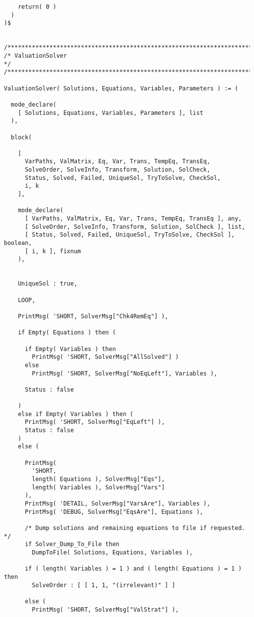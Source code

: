 \begin{verbatim}
    return( 0 )
  )
)$


/******************************************************************************/
/* ValuationSolver                                                            */
/******************************************************************************/

ValuationSolver( Solutions, Equations, Variables, Parameters ) := (

  mode_declare(
    [ Solutions, Equations, Variables, Parameters ], list
  ),

  block(

    [
      VarPaths, ValMatrix, Eq, Var, Trans, TempEq, TransEq,
      SolveOrder, SolveInfo, Transform, Solution, SolCheck,
      Status, Solved, Failed, UniqueSol, TryToSolve, CheckSol,
      i, k
    ],

    mode_declare(
      [ VarPaths, ValMatrix, Eq, Var, Trans, TempEq, TransEq ], any,
      [ SolveOrder, SolveInfo, Transform, Solution, SolCheck ], list,
      [ Status, Solved, Failed, UniqueSol, TryToSolve, CheckSol ], boolean,
      [ i, k ], fixnum
    ),


    UniqueSol : true,

    LOOP,

    PrintMsg( 'SHORT, SolverMsg["Chk4RemEq"] ),

    if Empty( Equations ) then (

      if Empty( Variables ) then
        PrintMsg( 'SHORT, SolverMsg["AllSolved"] )
      else
        PrintMsg( 'SHORT, SolverMsg["NoEqLeft"], Variables ),

      Status : false

    )
    else if Empty( Variables ) then (
      PrintMsg( 'SHORT, SolverMsg["EqLeft"] ),
      Status : false
    )
    else (

      PrintMsg(
        'SHORT,
        length( Equations ), SolverMsg["Eqs"],
        length( Variables ), SolverMsg["Vars"]
      ),
      PrintMsg( 'DETAIL, SolverMsg["VarsAre"], Variables ),
      PrintMsg( 'DEBUG, SolverMsg["EqsAre"], Equations ),

      /* Dump solutions and remaining equations to file if requested. */
      if Solver_Dump_To_File then
        DumpToFile( Solutions, Equations, Variables ),

      if ( length( Variables ) = 1 ) and ( length( Equations ) = 1 ) then
        SolveOrder : [ [ 1, 1, "(irrelevant)" ] ]

      else (
        PrintMsg( 'SHORT, SolverMsg["ValStrat"] ),


\end{verbatim}
